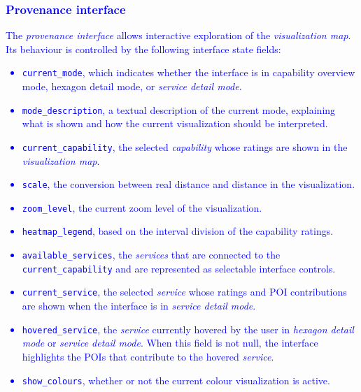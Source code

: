 \documentclass{article}
\newcommand{\mm}[1]{\textcolor{blue}{#1}}
\begin{document}
\subsubsection*{\mm{Provenance interface}}
\mm{
The \emph{provenance interface} allows interactive exploration of the \emph{visualization map}. Its behaviour is controlled by the following interface state fields:
\begin{itemize}
    \item \texttt{current\_mode}, which indicates whether the interface is in capability overview mode, hexagon detail mode, or \emph{service detail mode}.
    \item \texttt{mode\_description}, a textual description of the current mode, explaining what is shown and how the current visualization should be interpreted.
    \item \texttt{current\_capability}, the selected \emph{capability} whose ratings are shown in the \emph{visualization map}.
    \item \texttt{scale}, the conversion between real distance and distance in the visualization.
    \item \texttt{zoom\_level}, the current zoom level of the visualization.
    \item \texttt{heatmap\_legend}, based on the interval division of the capability ratings.
    \item \texttt{available\_services}, the \emph{services} that are connected to the \texttt{current\_capability} and are represented as selectable interface controls.
    \item \texttt{current\_service}, the selected \emph{service} whose ratings and POI contributions are shown when the interface is in \emph{service detail mode}.
    \item \texttt{hovered\_service}, the \emph{service} currently hovered by the user in \emph{hexagon detail mode} or \emph{service detail mode}. When this field is not null, the interface highlights the POIs that contribute to the hovered \emph{service}.
    \item \texttt{show\_colours}, whether or not the current colour visualization is active.
\end{itemize}
}
\end{document}
